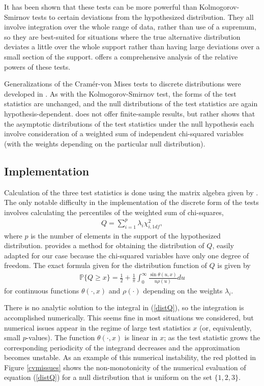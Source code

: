 It has been shown that these tests can be more powerful than 
Kolmogorov-Smirnov tests to certain deviations from the hypothesized distribution. 
They all involve integration over the whole range of data, rather than
use of a supremum, so they are best-suited for situations where the
true alternative distribution deviates a little over the whole support
rather than having large deviations over a small section of the support. 
\cite{stephens1974} offers a comprehensive analysis of the relative powers
of these tests.

Generalizations of the Cram\'{e}r-von Mises tests to discrete
distributions were developed in \cite{choulakian1994}. As with the
Kolmogorov-Smirnov test, the forms of the test statistics are unchanged, 
and the null distributions of the test statistics are again hypothesis-dependent. \cite{choulakian1994} does not offer finite-sample results, but rather 
shows that the asymptotic distributions of the test statistics under the null hypothesis each involve consideration of a weighted sum of independent
chi-squared variables (with the weights depending on the particular
null distribution). 

\subsection{Implementation}

Calculation of the three test statistics is done using the
matrix algebra given by \cite{choulakian1994}. 
The only notable difficulty in the implementation of the discrete form
of the tests involves calculating the percentiles
of the weighted sum of chi-squares,
\begin{align}
Q = \sum_{i=1}^{p} \lambda_i \chi^2_{i,1df},   \label{eqQ}
\end{align}
where $p$ is the number of elements in the support of the hypothesized
distribution.
\cite{imhof1961} provides a method for obtaining the distribution of $Q$,
easily adapted for our case because
the chi-squared variables have only one degree of freedom.
The exact formula given for the distribution function of $Q$
is given by
\begin{align}
\mathbb{P}\{Q \geq x \} = \frac{1}{2} + 
\frac{1}{\pi} \int_{0}^{\infty} \frac{\sin\theta(u,x)}{u \rho(u) } du \label{distQ}
\end{align}
for continuous functions $\theta(\cdot, x)$ and $\rho(\cdot)$ depending on the  weights $\lambda_i$. 

There is no analytic solution to the integral in (\ref{distQ}), 
so the integration is
accomplished numerically. This seems fine in most situations we considered,
but numerical issues appear in the regime of large test statistics $x$
(or, equivalently, small $p$-values).
The function $\theta(\cdot, x)$ is linear in $x$; as the test statistic 
grows the corresponding periodicity of the integrand decreases and
the approximation becomes unstable. 
As an example of this numerical instability, the red plotted in
Figure \ref{cvmissues} shows the non-monotonicity of the numerical
evaluation of equation (\ref{distQ}) for a null distribution that is
uniform on the set $\{1,2,3\}$.

